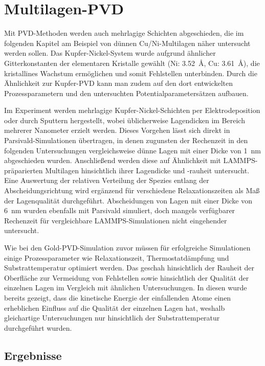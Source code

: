 \section{Multilagen-PVD}
\label{multilayer}

Mit PVD-Methoden werden auch mehrlagige Schichten abgeschieden, die im folgenden Kapitel am Beispiel von dünnen Cu/Ni-Multilagen näher untersucht werden sollen.
Das Kupfer-Nickel-System wurde aufgrund ähnlicher Gitterkonstanten der elementaren Kristalle gewählt (Ni: \SI{3.52}{\angstrom}, Cu: \SI{3.61}{\angstrom}), die kristallines Wachstum ermöglichen und somit Fehlstellen unterbinden.
Durch die Ähnlichkeit zur Kupfer-PVD kann man zudem auf den dort entwickelten Prozessparametern und den untersuchten Potentialparametersätzen aufbauen.

Im Experiment werden mehrlagige Kupfer-Nickel-Schichten per Elektro\-deposition\cite{yang_pulsed_1995} oder durch Sputtern\cite{cammarata_nanoindentation_1990} hergestellt, wobei üblicherweise Lagendicken im Bereich mehrerer Nanometer erzielt werden.
Dieses Vorgehen lässt sich direkt in Parsivald-Simulationen übertragen, in denen zugunsten der Rechenzeit in den folgenden Untersuchungen vergleichsweise dünne Lagen mit einer Dicke von \SI{1}{\nano\meter} abgeschieden wurden.
Anschließend werden diese auf Ähnlichkeit mit LAMMPS-präparierten Multilagen hinsichtlich ihrer Lagendicke und -rauheit untersucht.
Eine Auswertung der relativen Verteilung der Spezies entlang der Abscheidungsrichtung wird ergänzend für verschiedene Relaxationszeiten als Maß der Lagenqualität durchgeführt.
Abscheidungen von Lagen mit einer Dicke von \SI{6}{\nano\meter} wurden ebenfalls mit Parsivald simuliert, doch mangels verfügbarer Rechenzeit für vergleichbare LAMMPS-Simulationen nicht eingehender untersucht.

Wie bei den Gold-PVD-Simulation zuvor müssen für erfolgreiche Simulationen einige Prozessparameter wie Relaxationszeit, Thermostatdämpfung und Substrattemperatur optimiert werden.
Das geschah hinsichtlich der Rauheit der Oberfläche zur Vermeidung von Fehlstellen sowie hinsichtlich der Qualität der einzelnen Lagen im Vergleich mit ähnlichen Untersuchungen\cite{zhou_atomistic_1998}.
In diesen wurde bereits gezeigt, dass die kinetische Energie der einfallenden Atome einen erheblichen Einfluss auf die Qualität der einzelnen Lagen hat, weshalb gleichartige Untersuchungen nur hinsichtlich der Substrattemperatur durchgeführt wurden.

\subsection{Ergebnisse}

